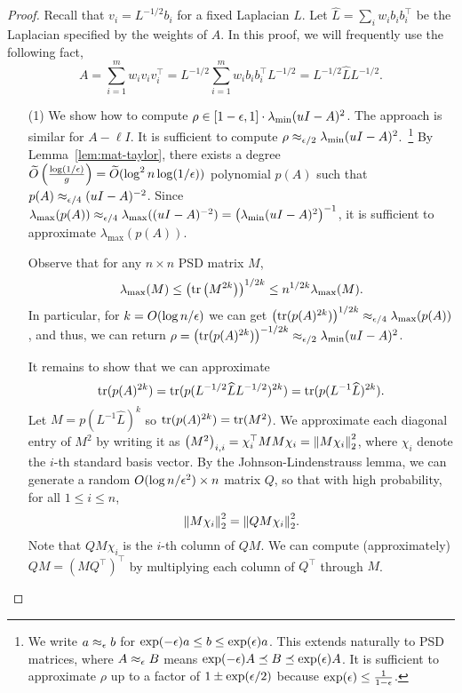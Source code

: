 \begin{proof}
Recall that $v_i = L^{-1/2} b_i$ for a fixed Laplacian $L$.
Let $\hat L = \sum_i w_i b_i b_i^\top$ be the Laplacian specified by the weights of $A$.
In this proof, we will frequently use the following fact,
\[
A = \sum_{i=1}^m w_i v_i v_i^\top = L^{-1/2} \sum_{i=1}^m w_i b_i b_i^\top L^{-1/2} = L^{-1/2} \hat L L^{-1/2}.
\]

\begin{enumerate}
\item[(1)] We show how to compute $\rho \in [1-\epsilon, 1] \cdot \lambda_{\min}(u I - A)^2$. The approach is similar for $A - \ell I$.
It is sufficient to compute $\rho \approx_{\epsilon/2} \lambda_{\min}(u I - A)^2$.~\footnote{We write $a \approx_{\epsilon} b$ for $\exp(-\epsilon) a \le b \le \exp(\epsilon) a$. This extends naturally to PSD matrices, where $A \approx_{\epsilon} B$ means $\exp(-\epsilon)A \preceq B \preceq \exp(\epsilon) A$. It is sufficient to approximate $\rho$ up to a factor of $1\pm \exp(\epsilon/2)$ because $\exp(\epsilon) \le \frac{1}{1-\epsilon}$.}
By Lemma~\ref{lem:mat-taylor}, there exists a degree $\widetilde O\left(\frac{\log(1/\epsilon)}{g}\right) = \widetilde O(\log^2 n \log(1/\epsilon))$ polynomial $p(A)$ such that $p(A) \approx_{\epsilon/4} (u I - A)^{-2}$.
Since $\lambda_{\max} (p(A)) \approx_{\epsilon/4} \lambda_{\max} ((u I - A)^{-2}) = \left(\lambda_{\min} (u I - A)^2\right)^{-1}$, it is sufficient to approximate $\lambda_{\max} (p(A))$.

Observe that for any $n \times n$ PSD matrix $M$,
\[
\lambda_{\max}(M) \le \left(\operatorname{tr}\left(M^{2k}\right)\right)^{1/2k} \le n^{1/2k} \lambda_{\max} (M).
\]
In particular, for $k = O(\log n / \epsilon)$ we can get $\left(\operatorname{tr}(p(A)^{2k})\right)^{1/2k} \approx_{\epsilon/4} \lambda_{\max}(p(A))$,
and thus, we can return $\rho = \left(\operatorname{tr}(p(A)^{2k})\right)^{-1/2k} \approx_{\epsilon/2} \lambda_{\min}(u I - A)^2$.

It remains to show that we can approximate
\[
\operatorname{tr}(p(A)^{2k}) = \operatorname{tr}(p(L^{-1/2} \widehat L L^{-1/2})^{2k}) = \operatorname{tr}(p(L^{-1} \widehat L)^{2k}).
\]
Let $M = p(L^{-1} \hat L)^{k}$ so $\operatorname{tr}(p(A)^{2k}) = \operatorname{tr}(M^2)$.
We approximate each diagonal entry of $M^2$ by writing it as $\left(M^2\right)_{i,i} = \chi_i^\top M M \chi_i = {\lVert M \chi_i{\rVert}}_2^2$, where $\chi_i$ denote the $i$-th standard basis vector.
By the Johnson-Lindenstrauss lemma, we can generate a random $O(\log n/\epsilon^2) \times n$ matrix $Q$, so that with high probability, for all $1 \le i \le n$,
\[
{\lVert M \chi_i{\rVert}}_2^2 = {\lVert Q M \chi_i{\rVert}}_2^2.
\]
Note that $Q M \chi_i$ is the $i$-th column of $QM$.
We can compute (approximately) $Q M = \left(M Q^\top\right)^\top$ by multiplying each column of $Q^\top$ through $M$.


\end{enumerate}
\end{proof}
